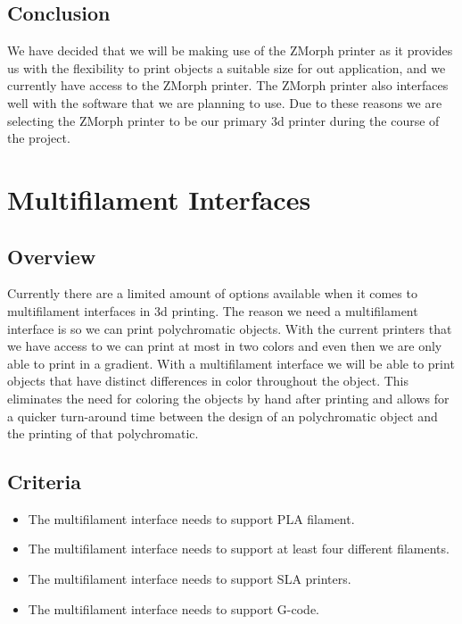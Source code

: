 \documentclass[letterpaper, onecolumn, draftclsnofoot, 10pt, compsoc]{IEEEtran}
\begin{document}
\subsection{Conclusion}
	\begin{singlespacing}
    	We have decided that we will be making use of the ZMorph printer as it provides us with the flexibility to print objects a suitable size for out application, and we currently have access to the ZMorph printer. The ZMorph printer also interfaces well with the software that we are planning to use. Due to these reasons we are selecting the ZMorph printer to be our primary 3d printer during the course of the project.
    \end{singlespacing}

\section{Multifilament Interfaces}
\subsection{Overview}
	\begin{singlespacing}
	Currently there are a limited amount of options available when it comes to multifilament interfaces in 3d printing. The reason we need a multifilament interface is so we can print polychromatic objects. With the current printers that we have access to we can print at most in two colors and even then we are only able to print in a gradient. With a multifilament interface we will be able to print objects that have distinct differences in color throughout the object. This eliminates the need for coloring the objects by hand after printing and allows for a quicker turn-around time between the design of an polychromatic object and the printing of that polychromatic.
    \end{singlespacing}
\subsection{Criteria}
	\begin{singlespacing}
    	\begin{itemize}
    	\item The multifilament interface needs to support PLA filament.
        \item The multifilament interface needs to support at least four different filaments.
        \item The multifilament interface needs to support SLA printers.
        \item The multifilament interface needs to support G-code.
    	\end{itemize}
    \end{singlespacing}
\end{document}
